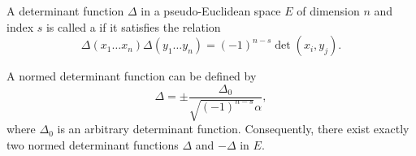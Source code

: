 A determinant function $\Delta$ in a pseudo-Euclidean space $E$ of dimension $n$ and index $s$ is called a  if it satisfies the relation
$$\Delta(x_1 \ldots x_n) \Delta(y_1 \ldots y_n) = (-1)^{n-s} \det(x_i, y_j).$$

A normed determinant function can be defined by
$$\Delta = \pm \frac{\Delta_0}{\sqrt{(-1)^{n-s}} \alpha},$$
where $\Delta_0$ is an arbitrary determinant function. Consequently, there exist exactly two normed determinant functions $\Delta$ and $-\Delta$ in $E$.

